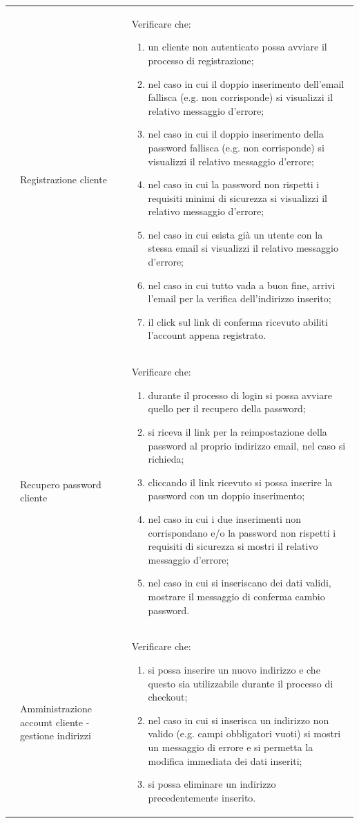 \begin{center}
\begin{longtable}{|p{1cm}|p{4.85cm}|p{9cm}|}
		 & Registrazione cliente & Verificare che:
		\begin{enumerate}
			\item un cliente non autenticato possa avviare il processo di registrazione;
			\item nel caso in cui il doppio inserimento dell'email fallisca (e.g. non corrisponde) si visualizzi il relativo messaggio d'errore;
			\item nel caso in cui il doppio inserimento della password fallisca (e.g. non corrisponde) si visualizzi il relativo messaggio d'errore;
			\item nel caso in cui la password non rispetti i requisiti minimi di sicurezza si visualizzi il relativo messaggio d'errore;
			\item nel caso in cui esista già un utente con la stessa email si visualizzi il relativo messaggio d'errore;
			\item nel caso in cui tutto vada a buon fine, arrivi l'email per la verifica dell'indirizzo inserito;
			\item il click sul link di conferma ricevuto abiliti l'account appena registrato.
		\end{enumerate} \\

		 & Recupero password cliente & Verificare che:
		\begin{enumerate}
			\item durante il processo di login si possa avviare quello per il recupero della password;
			\item si riceva il link per la reimpostazione della password al proprio indirizzo email, nel caso si richieda;
			\item cliccando il link ricevuto si possa inserire la password con un doppio inserimento;
			\item nel caso in cui i due inserimenti non corrispondano e/o la password non rispetti i requisiti di sicurezza si mostri il relativo messaggio d'errore;
			\item nel caso in cui si inseriscano dei dati validi, mostrare il messaggio di conferma cambio password.
		\end{enumerate} \\

		 & Amministrazione account cliente - gestione indirizzi & Verificare che:
		\begin{enumerate}
			\item si possa inserire un nuovo indirizzo e che questo sia utilizzabile durante il processo di checkout; 
			\item nel caso in cui si inserisca un indirizzo non valido (e.g. campi obbligatori vuoti) si mostri un messaggio di errore e si permetta la modifica immediata dei dati inseriti;
			\item si possa eliminare un indirizzo precedentemente inserito.
		\end{enumerate} \\


\end{longtable}
\end{center}
